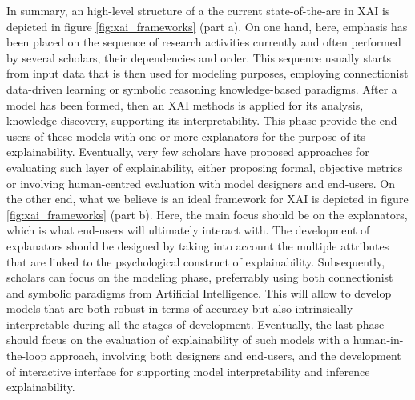 \documentclass[final,1p,times]{elsarticle}
\begin{document}
\newpage
In summary, an high-level structure of a the current state-of-the-are in XAI is depicted in figure \ref{fig:xai_frameworks} (part a). On one hand, here, emphasis has been placed on the sequence of research activities currently and often performed by several scholars, their dependencies and order. This sequence usually starts from input data that is then used for modeling purposes, employing connectionist data-driven learning or symbolic reasoning knowledge-based paradigms. 
After a model has been formed, then an XAI methods is applied for its analysis, knowledge discovery, supporting its interpretability. This phase provide the end-users of these models with one or more explanators for the purpose of its explainability. 
Eventually, very few scholars have proposed approaches for evaluating such layer of explainability, either proposing formal, objective metrics or involving human-centred evaluation with model designers and end-users.
On the other end, what we believe is an ideal framework for XAI is depicted  in figure \ref{fig:xai_frameworks} (part b). 
Here, the main focus should be on the explanators, which is what end-users will ultimately interact with. The development of explanators should be designed by taking into account the multiple attributes that are linked to the psychological construct of explainability. Subsequently, scholars can focus on the modeling phase, preferrably using both connectionist and symbolic paradigms from Artificial Intelligence. This will allow to develop models that are both robust in terms of accuracy but also intrinsically interpretable during all the stages of development.
Eventually, the last phase should focus on the evaluation of explainability of such models with a human-in-the-loop approach, involving both designers and end-users, and the development of interactive interface for supporting model interpretability and inference explainability.\\







\end{document}
